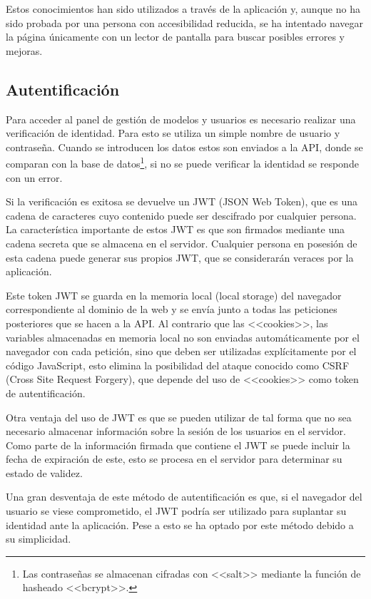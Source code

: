 Estos conocimientos han sido utilizados a través de la aplicación y, aunque no
ha sido probada por una persona con accesibilidad reducida, se ha intentado
navegar la página únicamente con un lector de pantalla para buscar posibles
errores y mejoras.

\subsection{Autentificación}

Para acceder al panel de gestión de modelos y usuarios es necesario realizar una
verificación de identidad. Para esto se utiliza un simple nombre de usuario y
contraseña. Cuando se introducen los datos estos son enviados a la API, donde se
comparan con la base de datos\footnote{Las contraseñas se almacenan cifradas con
<<salt>> mediante la función de hasheado <<bcrypt>>.}, si no se puede verificar
la identidad se responde con un error.

Si la verificación es exitosa se devuelve un JWT (JSON Web Token), que es una
cadena de caracteres cuyo contenido puede ser descifrado por cualquier persona.
La característica importante de estos JWT es que son firmados mediante una
cadena secreta que se almacena en el servidor. Cualquier persona en posesión de
esta cadena puede generar sus propios JWT, que se considerarán veraces por la
aplicación.

Este token JWT se guarda en la memoria local (local storage) del navegador
correspondiente al dominio de la web y se envía junto a todas las peticiones
posteriores que se hacen a la API. Al contrario que las <<cookies>>, las
variables almacenadas en memoria local no son enviadas automáticamente por el
navegador con cada petición, sino que deben ser utilizadas explícitamente por el
código JavaScript, esto elimina la posibilidad del ataque conocido como CSRF
(Cross Site Request Forgery), que depende del uso de <<cookies>> como token de
autentificación.

Otra ventaja del uso de JWT es que se pueden utilizar de tal forma que no sea
necesario almacenar información sobre la sesión de los usuarios en el servidor.
Como parte de la información firmada que contiene el JWT se puede incluir la
fecha de expiración de este, esto se procesa en el servidor para determinar su
estado de validez.

Una gran desventaja de este método de autentificación es que, si el navegador
del usuario se viese comprometido, el JWT podría ser utilizado para suplantar su
identidad ante la aplicación. Pese a esto se ha optado por este método debido a
su simplicidad.

